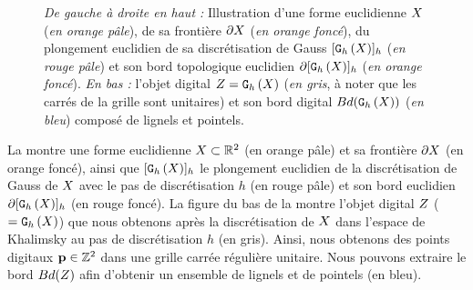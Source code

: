 \begin{figure}[ht]
  \begin{center}
    
  \end{center}
  \caption{\emph{De gauche à droite en haut :} Illustration d'une forme
  euclidienne $X$ (\emph{en orange pâle}), de sa frontière $\partial X$ (\emph{en
  orange foncé}), du plongement euclidien de sa discrétisation de Gauss
  $\lbrack \mathtt{G}_{h}\left(X\right) \rbrack_{h}$ (\emph{en rouge pâle}) et son bord topologique euclidien
  $\partial\lbrack \mathtt{G}_{h}\left(X\right) \rbrack_{h}$ (\emph{en orange foncé}). \emph{En bas :} l'objet
  digital $Z = \mathtt{G}_{h}\left(X\right)$ (\emph{en gris}, à noter que les carrés de la
  grille sont unitaires) et son bord digital $Bd(\mathtt{G}_{h}\left(X\right))$ (\emph{en
  bleu}) composé de lignels et pointels. \label{fig:frontier}}
\end{figure}


La  montre une forme euclidienne $X \subset \mathbb{R}^2$
(en orange pâle) et sa frontière $\partial X$ (en orange foncé), ainsi que
$\lbrack \mathtt{G}_{h}\left(X\right) \rbrack_{h}$ le plongement euclidien de la discrétisation de Gauss de
$X$ avec le pas de discrétisation $h$ (en rouge pâle) et son bord euclidien
$\partial\lbrack \mathtt{G}_{h}\left(X\right) \rbrack_{h}$ (en rouge foncé). La figure du bas de la
 montre l'objet digital $Z$ ($= \mathtt{G}_{h}\left(X\right)$) que nous
obtenons après la discrétisation de $X$ dans l'espace de Khalimsky au pas
de discrétisation $h$ (en gris). Ainsi, nous obtenons des points digitaux $\mathbf{p}
\in \mathbb{Z}^2$ dans une grille carrée régulière unitaire. Nous pouvons extraire le
bord $Bd(Z)$ afin d'obtenir un ensemble de lignels et de
pointels (en bleu).


